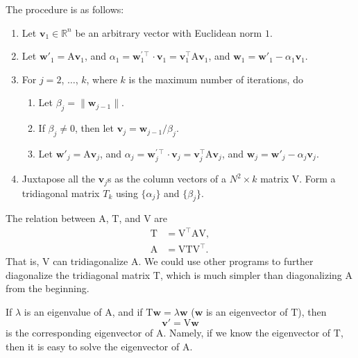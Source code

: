 The procedure is as follows:
%
\begin{enumerate}
    \item\label{it:v1} Let \(\bm{v}_1 \in \mathbb{ R }^n\) be an arbitrary vector with Euclidean norm \(1\).
    \item Let \(\bm{w}'_1 = \mathrm{A} \bm{v}_1\), and
          \(\alpha_1 = \bm{w}^{\prime\intercal}_1 \cdot \bm{v}_1 = \bm{v}_1^\intercal \mathrm{A} \bm{v}_1\),
          and \(\bm{w}_1 = \bm{w}'_1 - \alpha_1 \bm{v}_1\).
    \item For \(j = 2\), \(\ldots\), \(k\), where \(k\) is the maximum number of iterations, do
          \begin{enumerate}
              \item Let \(\beta_j = \| \bm{w}_{j-1} \|\).
              \item If \(\beta_j \neq 0\), then let \(\bm{v}_j = \bm{w}_{j-1} / \beta_j\).
              \item Let \(\bm{w}'_j = \mathrm{A} \bm{v}_j\), and
                    \(\alpha_j = \bm{w}^{\prime\intercal}_j \cdot \bm{v}_j = \bm{v}_j^\intercal \mathrm{A} \bm{v}_j\),
                    and \(\bm{w}_j = \bm{w}'_j - \alpha_j \bm{v}_j\).
          \end{enumerate}
    \item Juxtapose all the \(\bm{v}_j\)s as the
          column vectors of a \(N^2 \times k\) matrix \(\mathrm{V}\).
          Form a tridiagonal matrix \(T_k\) using \(\{\alpha_j\}\) and \(\{\beta_j\}\).
\end{enumerate}
%
The relation between \(\mathrm{A}\), \(\mathrm{T}\), and \(\mathrm{V}\) are
%
\begin{align}
    \mathrm{T} & = \mathrm{V}^\intercal \mathrm{A} \mathrm{V}, \\
    \mathrm{A} & = \mathrm{V} \mathrm{T} \mathrm{V}^\intercal.
\end{align}
%
That is, \(\mathrm{V}\) can tridiagonalize \(\mathrm{A}\).
We could use other programs to further diagonalize the tridiagonal matrix \(\mathrm{T}\),
which is much simpler than diagonalizing \(\mathrm{A}\) from the beginning.

If \(\lambda\) is an eigenvalue of \(\mathrm{A}\), and if \(\mathrm{T}\bm{w} = \lambda \bm{w}\)
(\(\bm{w}\) is an eigenvector of \(\mathrm{T}\)), then
%
\begin{equation}\label{eq:eigen}
    \bm{v}' = \mathrm{V} \bm{w}
\end{equation}
%
is the corresponding eigenvector of \(\mathrm{A}\). Namely, if we know the eigenvector
of \(\mathrm{T}\), then it is easy to solve the eigenvector of \(\mathrm{A}\).

